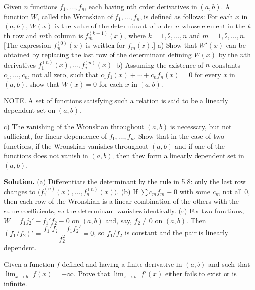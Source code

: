 \begin{problembox}
Given \( n \) functions \( f_1, \ldots, f_n \), each having nth order derivatives in \( (a, b) \). A function \( W \), called the Wronskian of \( f_1, \ldots, f_n \), is defined as follows: For each \( x \) in \( (a, b) \), \( W(x) \) is the value of the determinant of order \( n \) whose element in the \( k \)th row and \( m \)th column is \( f_m^{(k-1)}(x) \), where \( k = 1, 2, \ldots, n \) and \( m = 1, 2, \ldots, n \). [The expression \( f_m^{(0)}(x) \) is written for \( f_m(x) \).]
a) Show that \( W'(x) \) can be obtained by replacing the last row of the determinant defining \( W(x) \) by the \( n \)th derivatives \( f_1^{(n)}(x), \ldots, f_n^{(n)}(x) \).
b) Assuming the existence of \( n \) constants \( c_1, \ldots, c_n \), not all zero, such that \( c_1 f_1(x) + \cdots + c_n f_n(x) = 0 \) for every \( x \) in \( (a, b) \), show that \( W(x) = 0 \) for each \( x \) in \( (a, b) \).

NOTE. A set of functions satisfying such a relation is said to be a linearly dependent set on \( (a, b) \).

c) The vanishing of the Wronskian throughout \( (a, b) \) is necessary, but not sufficient, for linear dependence of \( f_1, \ldots, f_n \). Show that in the case of two functions, if the Wronskian vanishes throughout \( (a, b) \) and if one of the functions does not vanish in \( (a, b) \), then they form a linearly dependent set in \( (a, b) \).
\end{problembox}

\noindent\textbf{Solution.}
(a) Differentiate the determinant by the rule in 5.8: only the last row changes to $\big(f_1^{(n)}(x),\dots,f_n^{(n)}(x)\big)$. (b) If $\sum c_m f_m\equiv 0$ with some $c_m$ not all $0$, then each row of the Wronskian is a linear combination of the others with the same coefficients, so the determinant vanishes identically. (c) For two functions, $W=f_1 f_2'-f_1'f_2\equiv 0$ on $(a,b)$ and, say, $f_2\ne 0$ on $(a,b)$. Then $(f_1/f_2)'=\dfrac{f_1'f_2-f_1 f_2'}{f_2^2}=0$, so $f_1/f_2$ is constant and the pair is linearly dependent.

\begin{problembox}
Given a function \( f \) defined and having a finite derivative in \( (a, b) \) and such that \( \lim_{x \to b^-} f(x) = +\infty \). Prove that \( \lim_{x \to b^-} f'(x) \) either fails to exist or is infinite.
\end{problembox}

